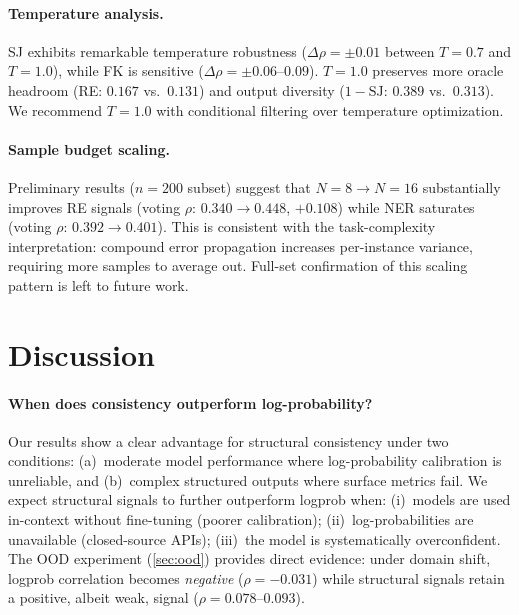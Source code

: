 \documentclass[11pt]{article}
\begin{document}
\paragraph{Temperature analysis.}
SJ exhibits remarkable temperature robustness ($\Delta\rho{=}\pm 0.01$ between $T{=}0.7$ and $T{=}1.0$), while FK is sensitive ($\Delta\rho{=}\pm 0.06$--$0.09$).
$T{=}1.0$ preserves more oracle headroom (RE: $0.167$ vs.\ $0.131$) and output diversity ($1{-}\text{SJ}$: $0.389$ vs.\ $0.313$).
We recommend $T{=}1.0$ with conditional filtering over temperature optimization.

\paragraph{Sample budget scaling.}
Preliminary results ($n{=}200$ subset) suggest that $N{=}8 \to N{=}16$ substantially improves RE signals (voting $\rho$: $0.340 \to 0.448$, $+0.108$) while NER saturates (voting $\rho$: $0.392 \to 0.401$).
This is consistent with the task-complexity interpretation: compound error propagation increases per-instance variance, requiring more samples to average out.
Full-set confirmation of this scaling pattern is left to future work.


\section{Discussion}

\paragraph{When does consistency outperform log-probability?}
Our results show a clear advantage for structural consistency under two conditions: (a)~moderate model performance where log-probability calibration is unreliable, and (b)~complex structured outputs where surface metrics fail.
We expect structural signals to further outperform logprob when: (i)~models are used in-context without fine-tuning (poorer calibration); (ii)~log-probabilities are unavailable (closed-source APIs); (iii)~the model is systematically overconfident.
The OOD experiment (\cref{sec:ood}) provides direct evidence: under domain shift, logprob correlation becomes \emph{negative} ($\rho{=}{-}0.031$) while structural signals retain a positive, albeit weak, signal ($\rho{=}0.078$--$0.093$).
\end{document}
